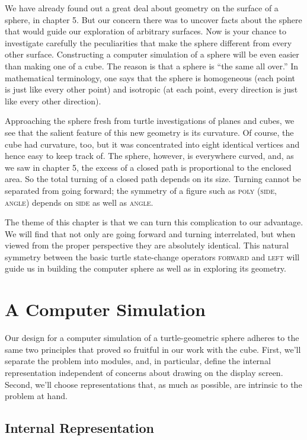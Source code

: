 \documentclass{book}
\begin{document}
We have already found out a great deal about geometry on the surface
of a sphere, in chapter 5. But our concern there was to uncover facts
about the sphere that would guide our exploration of arbitrary surfaces.
Now is your chance to investigate carefully the peculiarities that make
the sphere different from every other surface. Constructing a computer
simulation of a sphere will be even easier than making one of a cube.
The reason is that a sphere is ``the same all over.'' In mathematical
terminology, one says that the sphere is homogeneous (each point is
just like every other point) and isotropic (at each point, every direction
is just like every other direction).

Approaching the sphere fresh from turtle investigations of planes and
cubes, we see that the salient feature of this new geometry is its curvature. Of course, the cube had curvature, too, but it was concentrated
into eight identical vertices and hence easy to keep track of. The sphere,
however, is everywhere curved, and, as we saw in chapter 5, the excess
of a closed path is proportional to the enclosed area. So the total turning of a closed path depends on its size. Turning cannot be separated
from going forward; the symmetry of a figure such as \textsc{poly} (\textsc{side}, \textsc{angle})
depends on \textsc{side} as well as \textsc{angle}.

The theme of this chapter is that we can turn this complication to our
advantage. We will find that not only are going forward and turning
interrelated, but when viewed from the proper perspective they are
absolutely identical. This natural symmetry between the basic turtle
state-change operators \textsc{forward} and \textsc{left} will guide us in building the
computer sphere as well as in exploring its geometry.

\section{A Computer Simulation}

Our design for a computer simulation of a turtle-geometric sphere adheres to the same two principles that proved so fruitful in our work with
the cube. First, we'll separate the problem into modules, and, in particular, define the internal representation independent of concerns about
drawing on the display screen. Second, we'll choose representations that,
as much as possible, are intrinsic to the problem at hand.

\subsection{Internal Representation}
\end{document}
